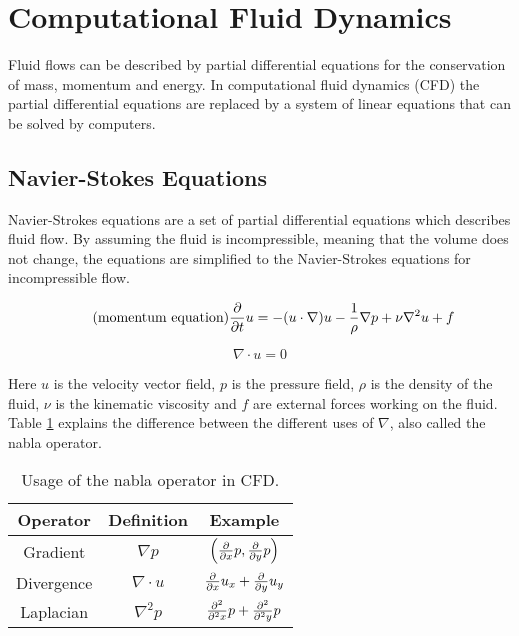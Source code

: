 \section{Computational Fluid Dynamics}

Fluid flows can be described by partial differential equations for the conservation 
of mass, momentum and energy. In computational fluid dynamics (CFD) the partial 
differential equations are replaced by a system of linear equations that can be 
solved by computers. 

\subsection{Navier-Stokes Equations}

Navier-Strokes equations are a set of partial differential equations which describes 
fluid flow\cite{fluidDynamicsIntro}. By assuming the fluid is incompressible, 
meaning that the volume does not change, the equations are simplified to the 
Navier-Strokes equations for incompressible flow\cite{originalSnowThesis}. 

\begin{equation} 
	\tag{momentum equation}
	\frac{\partial}{\partial t}u  = -(u \cdot \nabla)u - \frac{1}{\rho}\nabla p + \nu \nabla^2 u + f
\end{equation}

\begin{equation}
	\tag{continuity equation}
	\nabla \cdot u = 0
\end{equation}

Here $u$ is the velocity vector field, $p$ is the pressure field, $\rho$ is the 
density of the fluid, $\nu$ is the kinematic viscosity and $f$ are external 
forces working on the fluid\cite{gpuGemsCh38}. Table \ref{table:vectorCalculus} 
explains the difference between the different uses of $\nabla$, also called the 
nabla operator\cite{gpuGemsCh38}.

\begin{table}[h]
	\begin{center}
	\bgroup
	\def\arraystretch{1.5}
	\begin{tabular}{ccc}
		\hline
		Operator & Definition & Example \\
		\hline
		Gradient & $ \nabla p $ & $\Big( \frac{\partial}{\partial x}p, \frac{\partial}{\partial y}p \Big)$ \\ \hline
		Divergence & $ \nabla \cdot u $ & $ \frac{\partial}{\partial x}u_x + \frac{\partial}{\partial y}u_y $ \\ \hline
		Laplacian & $ \nabla^2 p $ & $ \frac{\partial^2}{\partial^2 x}p + \frac{\partial^2}{\partial^2 y}p $ \\ \hline
	\end{tabular}
	\egroup
	\end{center}
	\caption{Usage of the nabla operator in CFD.}
	\label{table:vectorCalculus}
\end{table}

